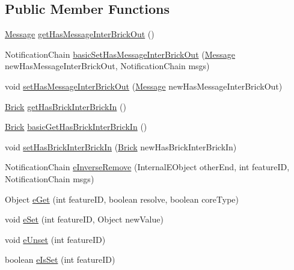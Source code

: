 \subsection*{Public Member Functions}
\begin{DoxyCompactItemize}
\item 
\hyperlink{interfaceshootingmachineemfmodel_1_1_message}{Message} \hyperlink{classshootingmachineemfmodel_1_1impl_1_1_inter_brick_out_impl_a3e64e1506f7b5f296ccfe42cc7e9adca}{get\-Has\-Message\-Inter\-Brick\-Out} ()
\item 
Notification\-Chain \hyperlink{classshootingmachineemfmodel_1_1impl_1_1_inter_brick_out_impl_abb771a4f5b4e2c585c0762fabe894592}{basic\-Set\-Has\-Message\-Inter\-Brick\-Out} (\hyperlink{interfaceshootingmachineemfmodel_1_1_message}{Message} new\-Has\-Message\-Inter\-Brick\-Out, Notification\-Chain msgs)
\item 
void \hyperlink{classshootingmachineemfmodel_1_1impl_1_1_inter_brick_out_impl_a70830c8c8849ce8ecb75e843b3ed8c1c}{set\-Has\-Message\-Inter\-Brick\-Out} (\hyperlink{interfaceshootingmachineemfmodel_1_1_message}{Message} new\-Has\-Message\-Inter\-Brick\-Out)
\item 
\hyperlink{interfaceshootingmachineemfmodel_1_1_brick}{Brick} \hyperlink{classshootingmachineemfmodel_1_1impl_1_1_inter_brick_out_impl_a9ce1832253cd613758fcf2c1ba674f15}{get\-Has\-Brick\-Inter\-Brick\-In} ()
\item 
\hyperlink{interfaceshootingmachineemfmodel_1_1_brick}{Brick} \hyperlink{classshootingmachineemfmodel_1_1impl_1_1_inter_brick_out_impl_ad3b02f165743b25e829247d304f5b7c3}{basic\-Get\-Has\-Brick\-Inter\-Brick\-In} ()
\item 
void \hyperlink{classshootingmachineemfmodel_1_1impl_1_1_inter_brick_out_impl_a8563be73baa89d52114e2ade67e7dc38}{set\-Has\-Brick\-Inter\-Brick\-In} (\hyperlink{interfaceshootingmachineemfmodel_1_1_brick}{Brick} new\-Has\-Brick\-Inter\-Brick\-In)
\item 
Notification\-Chain \hyperlink{classshootingmachineemfmodel_1_1impl_1_1_inter_brick_out_impl_a943a22dd94578f09b8c519e122c12138}{e\-Inverse\-Remove} (Internal\-E\-Object other\-End, int feature\-I\-D, Notification\-Chain msgs)
\item 
Object \hyperlink{classshootingmachineemfmodel_1_1impl_1_1_inter_brick_out_impl_a3df03383d4405461af23f39424981d4d}{e\-Get} (int feature\-I\-D, boolean resolve, boolean core\-Type)
\item 
void \hyperlink{classshootingmachineemfmodel_1_1impl_1_1_inter_brick_out_impl_a0abeebe4a8ff345779b7278fe404d7ec}{e\-Set} (int feature\-I\-D, Object new\-Value)
\item 
void \hyperlink{classshootingmachineemfmodel_1_1impl_1_1_inter_brick_out_impl_abfbfa5a7127307965f9bccf0efca4226}{e\-Unset} (int feature\-I\-D)
\item 
boolean \hyperlink{classshootingmachineemfmodel_1_1impl_1_1_inter_brick_out_impl_a733974b519c2b2440ee209640df344c0}{e\-Is\-Set} (int feature\-I\-D)
\end{DoxyCompactItemize}
